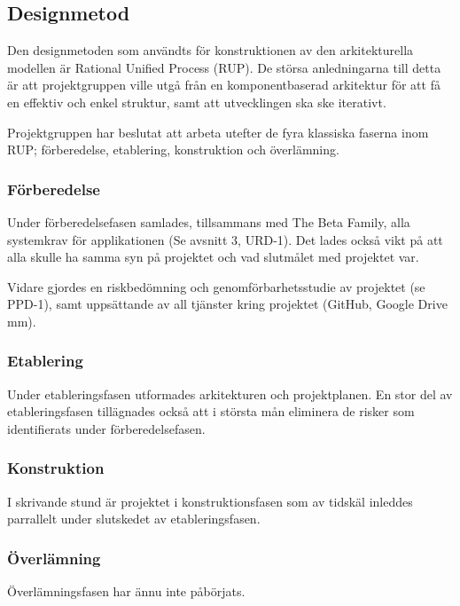 \subsection{Designmetod}
Den designmetoden som användts för konstruktionen av den arkitekturella modellen är Rational Unified Process (RUP). De störsa anledningarna till detta är att projektgruppen ville utgå från en komponentbaserad arkitektur för att få en effektiv och enkel struktur, samt att utvecklingen ska ske iterativt.

Projektgruppen har beslutat att arbeta utefter de fyra klassiska faserna inom RUP; förberedelse, etablering, konstruktion och överlämning. 

\subsubsection{Förberedelse}
Under förberedelsefasen samlades, tillsammans med The Beta Family, alla systemkrav för applikationen (Se avsnitt 3, URD-1). Det lades också vikt på att alla skulle ha samma syn på projektet och vad slutmålet med projektet var.

Vidare gjordes en riskbedömning och genomförbarhetsstudie av projektet (se PPD-1), samt uppsättande av all tjänster kring projektet (GitHub, Google Drive mm).

\subsubsection{Etablering}
Under etableringsfasen utformades arkitekturen och projektplanen. En stor del av etableringsfasen tillägnades också att i största mån eliminera de risker som identifierats under förberedelsefasen.

\subsubsection{Konstruktion}
I skrivande stund är projektet i konstruktionsfasen som av tidskäl inleddes parrallelt under slutskedet av etableringsfasen.

\subsubsection{Överlämning}
Överlämningsfasen har ännu inte påbörjats.